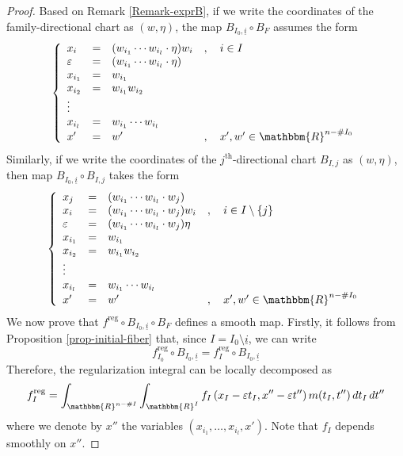 \documentclass[11pt,psamsfonts]{article}
\newcommand{\tmop}[1]{\ensuremath{\operatorname{#1}}}
\theoremstyle{definition}
\theoremstyle{remark}
\newcommand{\cR}{\ensuremath{\mathbbm{R}}}
\newcommand{\eps}{\varepsilon }
\newcommand{\reg}{\mathrm{reg}}
\begin{document}
\begin{proof}
  Based on Remark \ref{Remark-exprB}, if we write the coordinates of the
  family-directional chart as $(w, \eta)$, the map $B_{I_0, \underline{i}}
  \circ B_F$ assumes the form
  \begin{equation}
    \left\{\begin{array}{llll}
      x_i & = & (w_{i_1} \cdots w_{i_l} \cdot \eta) w_i & , \quad i \in I\\
      \eps & = & (w_{i_1} \cdots w_{i_l} \cdot \eta) & \\
      x_{i_1} & = & w_{i_1} & \\
      x_{i_2} & = & w_{i_1} w_{i_2} & \\
      \vdots &  &  & \\
      x_{i_l} & = & w_{i_1} \cdots w_{i_l} & \\
      x' & = & w' & , \quad x', w' \in \cR^{n -\#I_0}
    \end{array}\right. \label{chartBF}
  \end{equation}
  Similarly, if we write the coordinates of the $j^{\tmop{th}}$-directional
  chart $B_{I, j}$ as $(w, \eta)$, then map $B_{I_0, \underline{i}} \circ
  B_{I, j}$ takes the form
  \[ \left\{\begin{array}{llll}
       x_j & = & (w_{i_1} \cdots w_{i_l} \cdot w_j)  & \\
       x_i & = & (w_{i_1} \cdots w_{i_l} \cdot w_j) w_i & , \quad i \in I
       \setminus \{ j \}\\
       \eps & = & (w_{i_1} \cdots w_{i_l} \cdot w_j) \eta & \\
       x_{i_1} & = & w_{i_1} & \\
       x_{i_2} & = & w_{i_1} w_{i_2} & \\
       \vdots &  &  & \\
       x_{i_l} & = & w_{i_1} \cdots w_{i_l} & \\
       x' & = & w' & , \quad x', w' \in \cR^{n -\#I_0}
     \end{array}\right. \]
 We now prove that $f^{\reg} \circ B_{I_0, \underline{i}} \circ B_F$
  defines a smooth map. 
Firstly,  it follows from Proposition \ref{prop-initial-fiber} that, since $I=I_0 \setminus \underline{i}$, we can write
 \begin{equation}\label{freg-reg}
  f_{I_0}^\reg \circ B_{I_0,\underline{i}} = f_I^\reg \circ B_{I_0,\underline{i}}
 \end{equation}
  Therefore, the regularization integral can be locally decomposed as
   \[ f_I^{\reg} = \int_{\cR^{n -\#I}} \int_{\cR^I} f_{I}
     \left( x_{I} - \eps t_{I}, x'' - \eps t'' \right) m (t_{I}, t'')\, d t_{I} \,d t'' \]
  where we denote by $x''$ the
  variables $(x_{i_1}, \ldots, x_{i_l}, x')$. Note that $f_I$ depends smoothly on $x''$. 
  

\end{proof}
\end{document}
